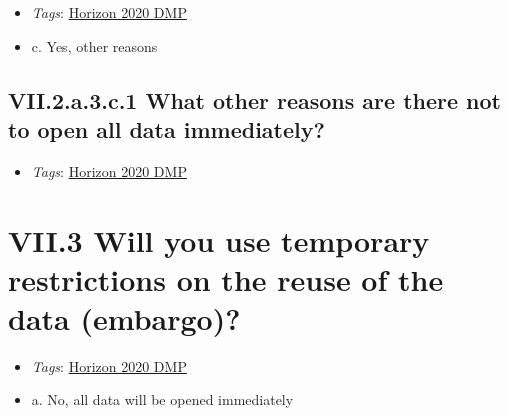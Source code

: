 \documentclass[a4paper,12pt]{report}
\begin{document}
\label{6be88f7c-f868-460f-bba7-91e1c659adfd.a549d10b-aa46-4c0c-863f-30219ac5ecce.b3739ebd-2d8e-42d3-9425-a7d6d1b26c79.c10f9098-5b1c-4abc-adaa-bdef2fb537ca}


\begin{itemize}
  \item \textit{Tags}: \ul{Horizon 2020 DMP}
  \end{itemize}




\begin{itemize}
  \item[\CheckmarkBold] c. Yes, other reasons
\end{itemize}




\subsection*{\protect\textcolor{colorSecId}{VII.2.a.3.c.1} What other reasons are there not to open all data immediately?}

\label{6be88f7c-f868-460f-bba7-91e1c659adfd.a549d10b-aa46-4c0c-863f-30219ac5ecce.b3739ebd-2d8e-42d3-9425-a7d6d1b26c79.c10f9098-5b1c-4abc-adaa-bdef2fb537ca.2b755a90-8a43-41c0-9020-5e2b9ca8f88e.b289fdcc-aedc-496e-8169-e0bbe2346d1f}


\begin{itemize}
  \item \textit{Tags}: \ul{Horizon 2020 DMP}
  \end{itemize}






\section*{\protect\textcolor{colorSecId}{VII.3} Will you use temporary restrictions on the reuse of the data (embargo)?}

\label{6be88f7c-f868-460f-bba7-91e1c659adfd.f5c12fcf-15d0-44ba-a53c-49ea9d7f620f}


\begin{itemize}
  \item \textit{Tags}: \ul{Horizon 2020 DMP}
  \end{itemize}




\begin{itemize}
  \item[\CheckmarkBold] a. No, all data will be opened immediately
\end{itemize}
\end{document}
